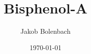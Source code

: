 \usepackage{lmodern}
\title{Bisphenol-A}   
\author{Jakob Bolenbach} 
\date{\today} 
\usepackage{beamerthemeshadow}
\usepackage{natbib}                  
\usepackage{bibgerm} 